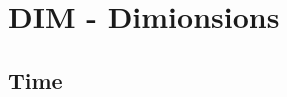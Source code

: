 \section[DIM]{DIM - Dimionsions}
\label{sec:dimionsions}

\subsection{Time}
\label{sec:dimionsions.time}
